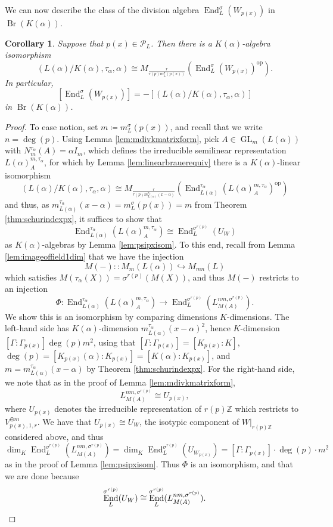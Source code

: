 \documentclass[10pt, reqno, hidelinks]{amsart}
\DeclareMathOperator{\opp}{op}
\DeclareMathOperator{\Br}{Br}
\DeclareMathOperator{\End}{End}
\DeclareMathOperator{\GL}{GL}
\newcommand{\bZ}{{\mathbb Z}}
\newcommand{\sP}{{\mathcal P}}
\numberwithin{thm}{subsection}
\newtheorem{cor}[thm]{Corollary}
\theoremstyle{definition}
\begin{document}
We can now describe the class of the division algebra $\End_{L}^{\sigma}(W_{p(x)})$ in $\Br(K(\alpha))$.

\begin{cor}\label{cor:descofendoinbrgroup}
	Suppose that $p(x) \in \sP_L$. Then there is a $K(\alpha)$-algebra isomorphism
	\[
	(L(\alpha) / K(\alpha), \tau_{\alpha}, \alpha) \cong M_{\frac{r}{r(p) m_L^{\sigma}(p(x))}}(\End_{L}^{\sigma}(W_{p(x)})^{\opp}).
	\]
	In particular,
	\[
	[\End_{L}^{\sigma}(W_{p(x)})] = -[(L(\alpha) / K(\alpha), \tau_{\alpha}, \alpha)]
	\]
	in $\Br(K(\alpha))$.
\end{cor}

\begin{proof}
	To ease notion, set $m \coloneqq m_L^{\sigma}(p(x))$, and recall that we write $n = \deg(p)$. Using Lemma \ref{lem:mdivkmatrixform}, pick $A \in \GL_m(L(\alpha))$ with $N_m^{\tau_{\alpha}}(A) = \alpha I_m$, which defines the irreducible semilinear representation $L(\alpha)_A^{m, \tau_{\alpha}}$, for which by Lemma \ref{lem:linearbrauerequiv} there is a $K(\alpha)$-linear isomorphism 
	\[
	(L(\alpha) / K(\alpha), \tau_{\alpha}, \alpha) \cong M_{\frac{r}{r(p) m_{L(\alpha)}^{\tau_{\alpha}}(x - \alpha)}}(\End_{L(\alpha)}^{\tau_{\alpha}}(L(\alpha)_A^{m, \tau_{\alpha}})^{\opp})
	\]
	and thus, as $m_{L(\alpha)}^{\tau_{\alpha}}(x - \alpha) = m_L^{\sigma}(p(x)) = m$ from Theorem \ref{thm:schurindexpx}, it suffices to show that
	\[
	\End_{L(\alpha)}^{\tau_{\alpha}}(L(\alpha)_A^{m, \tau_{\alpha}}) \cong \End_L^{\sigma^{r(p)}}(U_W)
	\]
	as $K(\alpha)$-algebras by Lemma \ref{lem:psipxisom}. To this end, recall from Lemma \ref{lem:imageoffield1dim} that we have the injection
	\[
	M(-) \colon \colon M_m(L(\alpha)) \hookrightarrow M_{mn}(L)
	\]
	which satisfies $M(\tau_{\alpha}(X)) = \sigma^{r(p)}(M(X))$, and thus $M(-)$ restricts to an injection
	\[
	\Phi \colon \End_{L(\alpha)}^{\tau_{\alpha}}(L(\alpha)_A^{m, \tau_{\alpha}}) \rightarrow \End_L^{\sigma^{r(p)}}(L_{M(A)}^{nm, \sigma^{r(p)}}).
	\]
	We show this is an isomorphism by comparing dimensions $K$-dimensions. The left-hand side has $K(\alpha)$-dimension $m_{L(\alpha)}^{\tau_{\alpha}}(x - \alpha)^2$, hence $K$-dimension $[\Gamma : \Gamma_{p(x)}] \deg(p) m^2$, using that $[\Gamma : \Gamma_{p(x)}] = [K_{p(x)} : K]$, $\deg(p) = [K_{p(x)}(\alpha) : K_{p(x)}] = [K(\alpha) : K_{p(x)}]$, and $m = m_{L(\alpha)}^{\tau_{\alpha}}(x - \alpha)$ by Theorem \ref{thm:schurindexpx}. For the right-hand side, we note that as in the proof of Lemma \ref{lem:mdivkmatrixform},
	\[
	L_{M(A)}^{nm, \sigma^{r(p)}} \cong U_{p(x)},
	\]
	where $U_{p(x)}$ denotes the irreducible representation of $r(p) \bZ$ which restricts to $V_{p(x), 1, r}^{\oplus m}$. We have that $U_{p(x)} \cong U_{W}$, the isotypic component of $W|_{r(p) \bZ}$ considered above, and thus 
	\[
	\dim_K \End_L^{\sigma^{r(p)}}(L_{M(A)}^{nm, \sigma^{r(p)}}) = \dim_K \End_L^{\sigma^{r(p)}}(U_{W_{p(x)}}) = [\Gamma : \Gamma_{p(x)}] \cdot \deg(p) \cdot m^2
	\]
	as in the proof of Lemma \ref{lem:psipxisom}. Thus $\Phi$ is an isomorphism, and that we are done because
	\[
	\End_L^{\sigma^{r(p)}}(U_W) \cong \End_L^{\sigma^{r(p)}}(L_{M(A)}^{nm, \sigma^{r(p)}}).\qedhere
	\]
\end{proof}
\end{document}

